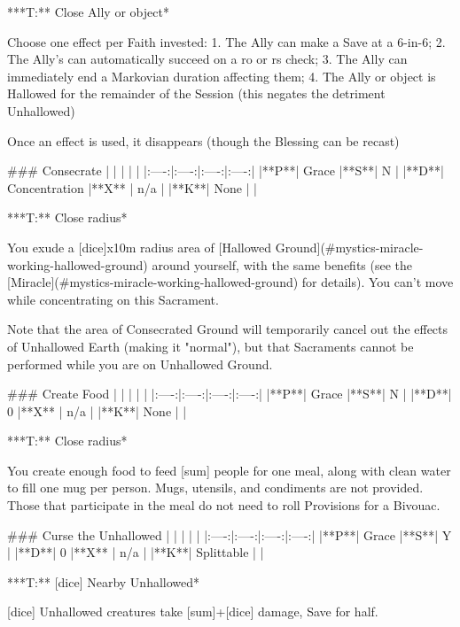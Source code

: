 ***T:**   Close Ally or object*



Choose one effect per Faith invested: 
1. The Ally can make a Save at a 6-in-6; 
2. The Ally's can automatically succeed on a {ro} or {rs} check;
3. The Ally can immediately end a Markovian duration affecting them;
4. The Ally or object is Hallowed for the remainder of the Session (this negates the detriment Unhallowed)

Once an effect is used, it disappears (though the Blessing can be recast)




### Consecrate
| | | | |
|:----:|:----:|:----:|:----:|
|**P**| Grace |**S**|  N |
|**D**| Concentration |**X** |  n/a  |
|**K**| None | |


***T:**   Close radius*



You exude a [dice]x10m radius area of [Hallowed Ground](#mystics-miracle-working-hallowed-ground) around yourself, with the same benefits (see the [Miracle](#mystics-miracle-working-hallowed-ground) for details).  You can't move while concentrating on this Sacrament.

Note that the area of Consecrated Ground will temporarily cancel out the effects of Unhallowed Earth (making it "normal"), but that Sacraments cannot be performed while you are on Unhallowed Ground.





### Create Food
| | | | |
|:----:|:----:|:----:|:----:|
|**P**| Grace |**S**|  N |
|**D**| 0 |**X** |  n/a  |
|**K**| None | |


***T:**   Close radius*



You create enough food to feed [sum] people for one meal, along with clean water to fill one mug per person. Mugs, utensils, and condiments are not provided.  Those that participate in the meal do not need to roll Provisions for a Bivouac.  



### Curse the Unhallowed
| | | | |
|:----:|:----:|:----:|:----:|
|**P**| Grace |**S**|  Y |
|**D**| 0  |**X** |  n/a  |
|**K**| Splittable | |


***T:**   [dice] Nearby Unhallowed*



[dice] Unhallowed creatures take [sum]+[dice] damage, Save for half.



